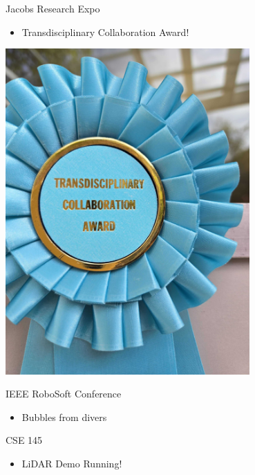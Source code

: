 \begin{frame}{Jacobs Research Expo}
    \begin{itemize}
        \item Transdisciplinary Collaboration Award!
    \end{itemize}    
    \centering
    \includegraphics[height=0.7\textheight,width=0.7\textwidth,keepaspectratio]{images/FishSenseAward.jpg}
\end{frame}

\begin{frame}{IEEE RoboSoft Conference}
    \begin{itemize}
        \item Bubbles from divers 
    \end{itemize}    
\end{frame}

\begin{frame}{CSE 145}
    \begin{itemize}
        \item LiDAR Demo Running!
    \end{itemize}    
\end{frame}